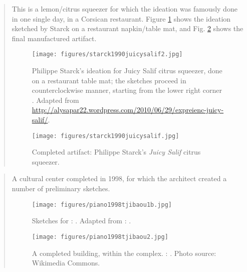 		\begin{quote}
		\small
		
		This is a lemon/citrus squeezer for which the ideation was 
		famously done in one single day, in a Corsican restaurant.
		Figure \ref{fig:starck1990juicysalif2} shows the ideation sketched by Starck on a restaurant 
		napkin/table mat, and Fig. \ref{fig:starck1990juicysalif} shows
		the final manufactured artifact.
		
		\begin{figure}[htb]
		\begin{center}
		\texttt{[image: figures/starck1990juicysalif2.jpg]}
		\caption{Philippe Starck's ideation for Juicy Salif citrus squeezer, done on a 
		restaurant table mat; the sketches proceed in counterclockwise manner, starting
		from the lower right corner \cite{lloyd2003philippe}.
		Adapted from 
		\url{http://alysapar22.wordpress.com/2010/06/29/expreienc-juicy-salif/}.}
		\label{fig:starck1990juicysalif2}
		\end{center}
		\end{figure}		
		
		\begin{figure}[htb]
		\begin{center}
		\texttt{[image: figures/starck1990juicysalif.jpg]}
		\caption{Completed artifact: Philippe Starck's {\em Juicy Salif} citrus squeezer.}
		\label{fig:starck1990juicysalif}
		\end{center}
		\end{figure}		
		
		\end{quote}

		
\clearpage
{}
		\begin{quote}
		\small
		A cultural center completed in 1998, for which the architect created a number of preliminary sketches.
		
		\begin{figure}[htb]
		\begin{center}
		\texttt{[image: figures/piano1998tjibaou1b.jpg]}
		\caption{
		Sketches for
		\citeauthor{piano1998tjibaou}: 
		\cite{piano1998tjibaou}.		
		Adapted from 
		\citeauthor{jodidio2005renzo}: 
		\cite{jodidio2005renzo}.
		}		
		\label{fig:piano1998tjibaou1}
		\end{center}
		\end{figure}		
		
		\begin{figure}[htb]
		\begin{center}
		\texttt{[image: figures/piano1998tjibaou2.jpg]}
		\caption{
		A completed building, within the complex.
		\citeauthor{piano1998tjibaou}: 
		\cite{piano1998tjibaou}.
		Photo source: Wikimedia Commons.
		}		
		\label{fig:piano1998tjibaou2}
		\end{center}
		\end{figure}		
		
		\end{quote}
				

